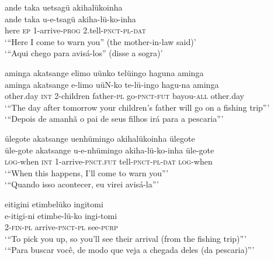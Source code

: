 \documentclass[output=paper,
modfonts,nonflat
]{langsci/langscibook}
\begin{document}
\ea ande taka uetsagü akihalükoinha \\[.3em]
\gll ande	taka	u-e-tsagü	akiha-lü-ko-inha \\
here	\textsc{ep}	1-arrive-\textsc{prog}	2.tell-\textsc{pnct-pl-dat} \\
\glt ‘“Here I come to warn you” (the mother-in-law said)’ \\
‘“Aqui chego para avisá-los” (disse a sogra)’ \\
\z

\ea aminga akatsange elimo uünko telüingo haguna aminga \\[.3em]
\gll aminga	akatsange	e-limo		uüN-ko	te-lü-ingo	hagu-na aminga \\
other.day 	\textsc{int}		2-children 	father-\textsc{pl} 	go-\textsc{pnct}-\textsc{fut} 	bayou-\textsc{all} 
other.day \\
\glt ‘“The day after tomorrow your children’s father will go on a fishing trip”’ \\
‘“Depois de amanhã o pai de seus filhos irá para a pescaria”’ \\
\z

\newpage 
\ea ülegote akatsange uenhümingo akihalükoinha ülegote \\[.3em]
\gll üle-gote	akatsange	u-e-nhümingo	akiha-lü-ko-inha	üle-gote \\
\textsc{log}-when	\textsc{int} 		1-arrive-\textsc{pnct.fut}	tell-\textsc{pnct-pl-dat}	\textsc{log}-when \\
\glt ‘“When this happens, I’ll come to warn you”’ \\
‘“Quando isso acontecer, eu virei avisá-la”’ \\
\z

  
\ea eitigini etimbelüko ingitomi \\[.3em]
\gll e-itigi-ni	etimbe-lü-ko	ingi-tomi \\
2-\textsc{fin-pl}		arrive-\textsc{pnct-pl}	see-\textsc{purp} \\
\glt ‘“To pick you up, so you’ll see their arrival (from the fishing trip)”’ \\
‘“Para buscar você, de modo que veja a chegada deles (da pescaria)”’ \\
\z
\end{document}
